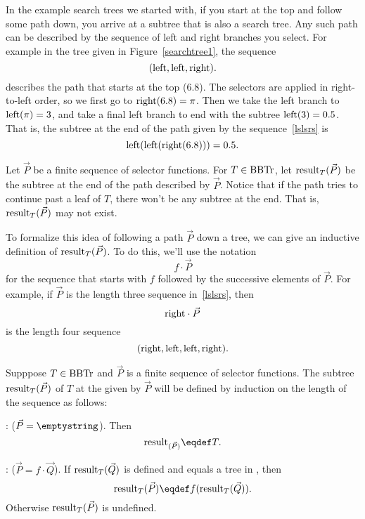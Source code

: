 In the example search trees we started with, if you start at the top
and follow some path down, you arrive at a subtree that is also a
search tree.  Any such path can be described by the sequence of left
and right branches you select.  For example in the tree given in
Figure~\ref{searchtree1}, the sequence
\begin{equation}\label{lslsrs}
(\text{left},\text{left},\text{right}).
\end{equation}
describes the path that starts at the top (6.8).  The selectors are
applied in right-to-left order, so we first go to $\text{right}(6.8) =
\pi$.  Then we take the left branch to $\text{left}(\pi) = 3$, and take a
final left branch to end with the subtree $\text{left}(3) = 0.5$.  That
is, the subtree at the end of the path given by the sequence~\eqref{lslsrs} is
\[
\text{left}(\text{left}(\text{right}(6.8))) = 0.5.
\]

Let $\vec{P}$ be a finite sequence of selector functions.  For $T \in
\text{BBTr}$, let $\text{result}_{T}(\vec{P})$ be the subtree at the end of the
path described by $\vec{P}$.  Notice that if the path tries to
continue past a leaf of $T$, there won't be any subtree at the end.
That is, $\text{result}_{T}(\vec{P})$ may not exist.

To formalize this idea of following a path $\vec{P}$ down a tree, we
can give an inductive definition of $\text{result}_{T}(\vec{P})$.  To do
this, we'll use the notation
\[
f \cdot \vec{P}
\]
for the sequence that starts with $f$ followed by the successive
elements of $\vec{P}$.  For example, if $\vec{P}$ is the length three
sequence in~\eqref{lslsrs}, then
\[
\text{right} \cdot \vec{P}
\]
is the length four sequence
\[
(\text{right}, \text{left},\text{left},\text{right}).
\]

\begin{definition}
Supppose $T \in \text{BBTr}$ and $\vec{P}$ is a finite sequence of selector
functions.  The subtree $\text{result}_{T}(\vec{P} )$ of $T$ at the  given by $\vec{P}$ will be defined by induction on
the length of the sequence as follows:

: ($\vec{P} = \emptystring$).
Then
\[
\rslt{(\vec{P})} \eqdef T.
\]

: ($\vec{P} = f \cdot \vec{Q}$).  If
$\text{result}_{T}(\vec{Q})$ is defined and equals a tree in \brnchng, then
\[
\rslt{T}{(\vec{P})} \eqdef f(\rslt{T}{(\vec{Q})}).
\]
Otherwise $\text{result}_{T}(\vec{P})$ is undefined.
\end{definition}

